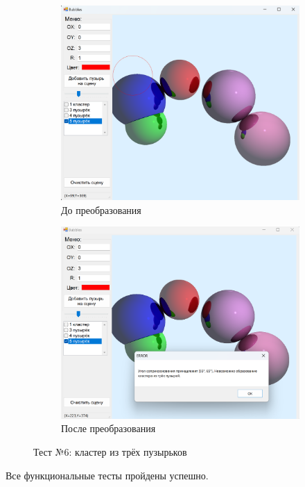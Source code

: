 \begin{figure}[h]
	\centering
	\begin{subfigure}{0.45\textwidth}
		\includegraphics[width=\linewidth]{pictures/test6_1.png}
		\caption{До преобразования}
		\label{fig:6first}
	\end{subfigure}
	\hfill
	\begin{subfigure}{0.45\textwidth}
		\includegraphics[width=\linewidth]{pictures/test6_2.png}
		\caption{После преобразования}
		\label{fig:6second}
	\end{subfigure}
	\caption{Тест №6: кластер из трёх пузырьков}
	\label{fig:test6}
\end{figure}

Все функциональные тесты пройдены успешно.